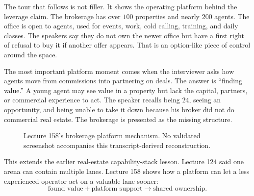 \documentclass[11pt,oneside]{book}
\begin{document}
The tour that follows is not filler. It shows the operating platform behind the leverage claim. The brokerage has over \(100\) properties and nearly \(200\) agents. The office is open to agents, used for events, work, cold calling, training, and daily classes. The speakers say they do not own the newer office but have a first right of refusal to buy it if another offer appears. That is an option-like piece of control around the space.

The most important platform moment comes when the interviewer asks how agents move from commissions into partnering on deals. The answer is ``finding value.'' A young agent may see value in a property but lack the capital, partners, or commercial experience to act. The speaker recalls being \(24\), seeing an opportunity, and being unable to take it down because his broker did not do commercial real estate. The brokerage is presented as the missing structure.

\begin{figure}
\centering
{}
\caption{Lecture 158's brokerage platform mechanism. No validated screenshot accompanies this transcript-derived reconstruction.}
\end{figure}

This extends the earlier real-estate capability-stack lesson. Lecture 124 said one arena can contain multiple lanes. Lecture 158 shows how a platform can let a less experienced operator act on a valuable lane sooner:
\[
\text{found value}
+
\text{platform support}
\longrightarrow
\text{shared ownership}.
\]
\end{document}
